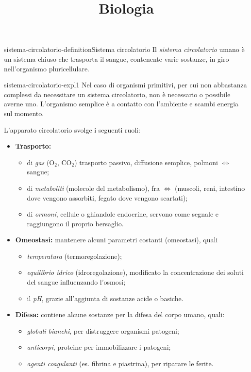 \documentclass[preview]{standalone}
\begin{document}
\title{Biologia}
\genpage

\begin{snippetdefinition}{sistema-circolatorio-definition}{Sistema circolatorio}
    Il \textit{sistema circolatorio} umano è un sistema chiuso
    che trasporta il sangue, contenente varie sostanze, in giro nell'organismo pluricellulare.
\end{snippetdefinition}

\begin{snippet}{sistema-circolatorio-expl1}
    Nel caso di organismi primitivi, per cui non abbastanza complessi da necessitare un sistema circolatorio,
    non è necessario o possibile averne uno.
    L'organismo semplice è a contatto con l'ambiente e scambi energia sul momento.

    L'apparato circolatorio svolge i seguenti ruoli:
    \begin{itemize}
        \item \textbf{Trasporto:} 
        \begin{itemize}
            \item di \textit{gas} (O\({}_2\), CO\({}_2\)) trasporto passivo, diffusione semplice, polmoni \(\iff\) sangue;
            \item di \textit{metaboliti} (molecole del metabolismo), fra \(\iff\) (muscoli, reni, intestino dove vengono assorbiti, fegato dove vengono scartati);
            \item di \textit{ormoni}, cellule o ghiandole endocrine, servono come segnale e raggiungono il proprio bersaglio. %
        \end{itemize}
        \item \textbf{Omeostasi:} mantenere alcuni parametri costanti (omeostasi), quali
            \begin{itemize}
                \item \textit{temperatura} (termoregolazione);
                \item \textit{equilibrio idrico} (idroregolazione), modificato la concentrazione dei soluti del sangue influenzando l'osmosi;
                \item il \textit{pH}, grazie all'aggiunta di sostanze acide o basiche.
            \end{itemize}
        \item \textbf{Difesa:} contiene alcune sostanze per la difesa del corpo umano, quali:
            \begin{itemize}
                \item \textit{globuli bianchi}, per distruggere organismi patogeni;
                \item \textit{anticorpi}, proteine per immobilizzare i patogeni;
                \item \textit{agenti coagulanti} (es. fibrina e piastrina), per riparare le ferite.
            \end{itemize}
    \end{itemize}


\end{snippet}
\end{document}
